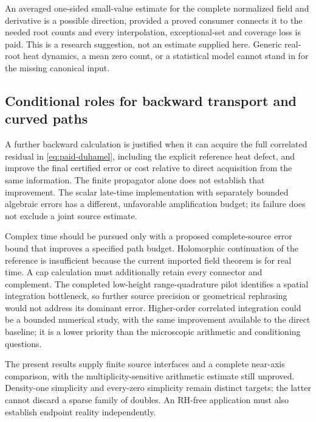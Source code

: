 An averaged one-sided small-value estimate for the complete normalized field
and derivative is a possible direction, provided a proved consumer connects
it to the needed root counts and every interpolation, exceptional-set and
coverage loss is paid. This is a research suggestion, not an estimate supplied
here. Generic real-root heat dynamics, a mean zero count, or a statistical
model cannot stand in for the missing canonical input.

\subsection{Conditional roles for backward transport and curved paths}
A further backward calculation is justified when it can acquire the full
correlated residual in \eqref{eq:paid-duhamel}, including the explicit
reference heat defect, and improve the final certified error or cost relative
to direct acquisition from the same information. The finite propagator alone
does not establish that improvement. The scalar late-time implementation
with separately bounded algebraic errors has a different, unfavorable
amplification budget; its failure does not exclude a joint source estimate.

Complex time should be pursued only with a proposed complete-source error
bound that improves a specified path budget. Holomorphic continuation of the
reference is insufficient because the current imported field theorem is for
real time. A cap calculation must additionally retain every connector and
complement. The completed low-height range-quadrature pilot identifies a
spatial integration bottleneck, so further source precision or geometrical
rephrasing would not address its dominant error. Higher-order correlated
integration could be a bounded numerical study, with the same improvement
available to the direct baseline; it is a lower priority than the microscopic
arithmetic and conditioning questions.

The present results supply finite source interfaces and a complete
near-axis comparison, with the multiplicity-sensitive arithmetic estimate
still unproved. Density-one simplicity and every-zero simplicity remain distinct
targets; the latter cannot discard a sparse family of doubles. An RH-free
application must also establish endpoint reality independently.
